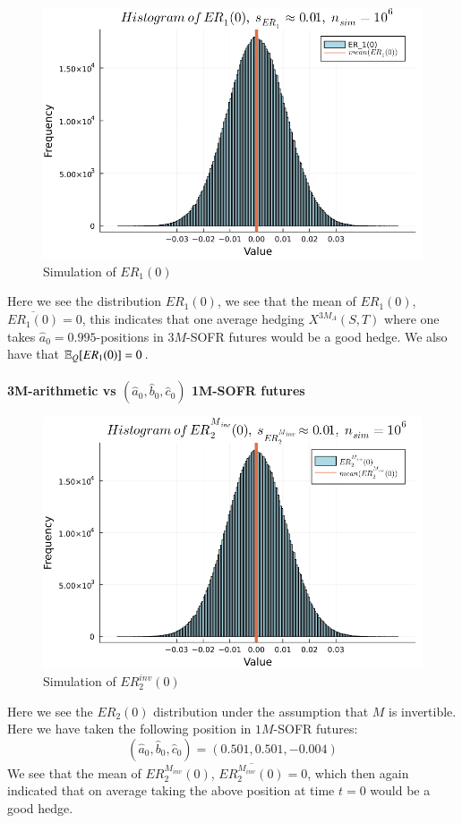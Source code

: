 \begin{figure}[htp]
    \centering
    \includegraphics[width=12cm]{figures/SOFR/ER_1(0).PNG}
    \caption{Simulation of $ER_{1}(0)$}
    \label{fig: ER_1_(0)}
\end{figure}

Here we see the distribution $ER_{1}(0)$, we see that the mean of $ER_{1}(0)$, $\overline{ER_{1}(0)} = 0$, this indicates that one average hedging $X^{3M_{A}}(S,T)$ where one takes $\hat{a}_{0} = 0.995$-positions in $3M$-SOFR futures would be a good hedge. We also have that $\mathbb{E}_{Q}[ER_{1}(0)] = 0$.  
\\~\\
\textbf{3M-arithmetic vs $(\hat{a}_{0}, \hat{b}_{0}, \hat{c}_{0})$ 1M-SOFR futures}

\begin{figure}[htp]
    \centering
    \includegraphics[width=12cm]{figures/SOFR/ER_2(0)_M_inv.PNG}
    \caption{Simulation of $ER_{2}^{inv}(0)$}
    \label{fig: ER_2_(0)_M_inv}
\end{figure}

Here we see the $ER_{2}(0)$ distribution under the assumption that $M$ is invertible. Here we have taken the following position in $1M$-SOFR futures: 
\[
(\hat{a}_{0}, \hat{b}_{0}, \hat{c}_{0})
= 
(0.501, 0.501, -0.004)
\]
We see that the mean of $ER_{2}^{M_{inv}}(0)$, $\overline{ER_{2}^{M_{inv}}(0)} = 0$, which then again indicated that on average taking the above position at time $t=0$ would be a good hedge. 
\\~\\ 



